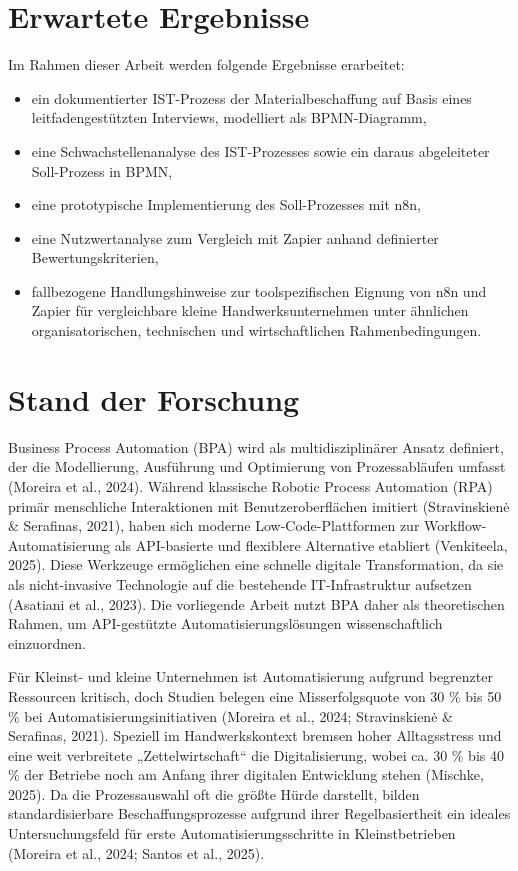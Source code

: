 ﻿\documentclass[a4paper,11pt]{article}
\begin{document}
\section{Erwartete Ergebnisse}
Im Rahmen dieser Arbeit werden folgende Ergebnisse erarbeitet:
\begin{itemize}
    \item ein dokumentierter IST-Prozess der Materialbeschaffung auf Basis eines leitfadengestützten Interviews, modelliert als BPMN-Diagramm,
    \item eine Schwachstellenanalyse des IST-Prozesses sowie ein daraus abgeleiteter Soll-Prozess in BPMN,
    \item eine prototypische Implementierung des Soll-Prozesses mit n8n,
    \item eine Nutzwertanalyse zum Vergleich mit Zapier anhand definierter Bewertungskriterien,
    \item fallbezogene Handlungshinweise zur toolspezifischen Eignung von n8n und Zapier für vergleichbare kleine Handwerksunternehmen unter ähnlichen organisatorischen, technischen und wirtschaftlichen Rahmenbedingungen.
\end{itemize}
\section{Stand der Forschung} 
Business Process Automation (BPA) wird als multidisziplinärer Ansatz definiert, der die Modellierung, Ausführung und Optimierung von Prozessabläufen umfasst (Moreira et al., 2024). Während klassische Robotic Process Automation (RPA) primär menschliche Interaktionen mit Benutzeroberflächen imitiert (Stravinskienė \& Serafinas, 2021), haben sich moderne Low-Code-Plattformen zur Workflow-Automatisierung als API-basierte und flexiblere Alternative etabliert (Venkiteela, 2025). Diese Werkzeuge ermöglichen eine schnelle digitale Transformation, da sie als nicht-invasive Technologie auf die bestehende IT-Infrastruktur aufsetzen (Asatiani et al., 2023). Die vorliegende Arbeit nutzt BPA daher als theoretischen Rahmen, um API-gestützte Automatisierungslösungen wissenschaftlich einzuordnen.

Für Kleinst- und kleine Unternehmen ist Automatisierung aufgrund begrenzter Ressourcen kritisch, doch Studien belegen eine Misserfolgsquote von 30 \% bis 50 \% bei Automatisierungsinitiativen (Moreira et al., 2024; Stravinskienė \& Serafinas, 2021). Speziell im Handwerkskontext bremsen hoher Alltagsstress und eine weit verbreitete „Zettelwirtschaft“ die Digitalisierung, wobei ca. 30 \% bis 40 \% der Betriebe noch am Anfang ihrer digitalen Entwicklung stehen (Mischke, 2025). Da die Prozessauswahl oft die größte Hürde darstellt, bilden standardisierbare Beschaffungsprozesse aufgrund ihrer Regelbasiertheit ein ideales Untersuchungsfeld für erste Automatisierungsschritte in Kleinstbetrieben (Moreira et al., 2024; Santos et al., 2025).
\end{document}
